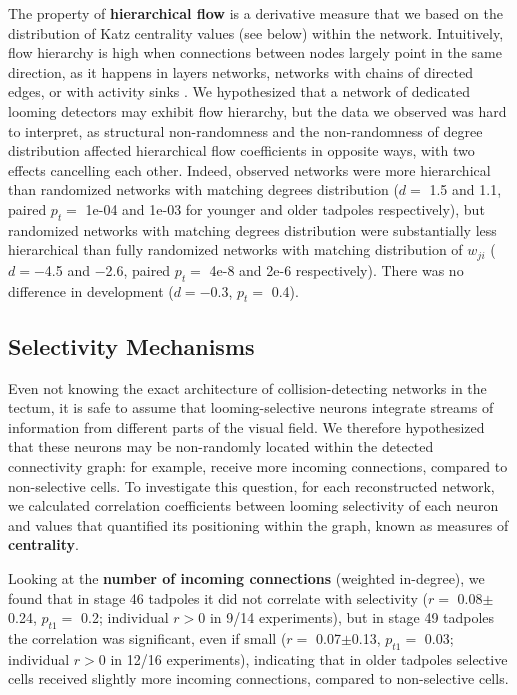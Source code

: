 \documentclass{article}
\begin{document}
The property of \textbf{hierarchical flow} is a derivative measure \citep{mones2012hierarchy} that we based on the distribution of Katz centrality values \citep{katz1953original,fletcher2018katz} (see below) within the network. Intuitively, flow hierarchy is high when connections between nodes largely point in the same direction, as it happens in layers networks, networks with chains of directed edges, or with activity sinks \citep{czegel2015hierarchy}. We hypothesized that a network of dedicated looming detectors may exhibit flow hierarchy, but the data we observed was hard to interpret, as structural non-randomness and the non-randomness of degree distribution affected hierarchical flow coefficients in opposite ways, with two effects cancelling each other. Indeed, observed networks were more hierarchical than randomized networks with matching degrees distribution ($d=$ 1.5 and 1.1, paired $p_t=$ 1e-04 and 1e-03 for younger and older tadpoles respectively), but randomized networks with matching degrees distribution were substantially less hierarchical than fully randomized networks with matching distribution of $w_{ji}$ ($d=-$4.5 and $-$2.6, paired $p_t=$ 4e-8 and 2e-6 respectively). There was no difference in development ($d=-$0.3, $p_t=$ 0.4).

\subsection*{Selectivity Mechanisms}

Even not knowing the exact architecture of collision-detecting networks in the tectum, it is safe to assume that looming-selective neurons integrate streams of information from different parts of the visual field. We therefore hypothesized that these neurons may be non-randomly located within the detected connectivity graph: for example, receive more incoming connections, compared to non-selective cells. To investigate this question, for each reconstructed network, we calculated correlation coefficients between looming selectivity of each neuron and values that quantified its positioning within the graph, known as measures of \textbf{centrality}.

Looking at the \textbf{number of incoming connections} (weighted in-degree), we found that in stage 46 tadpoles it did not correlate with selectivity ($r=$ 0.08$\pm$0.24, $p_{t1}=$ 0.2; individual $r>$0 in 9/14 experiments), but in stage 49 tadpoles the correlation was significant, even if small ($r=$ 0.07$\pm$0.13, $p_{t1}=$ 0.03; individual $r>$0 in 12/16 experiments), indicating that in older tadpoles selective cells received slightly more incoming connections, compared to non-selective cells.
\end{document}
